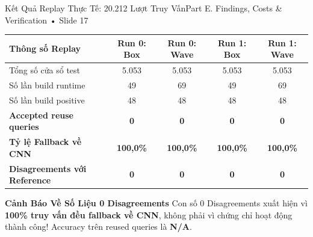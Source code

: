 \documentclass[aspectratio=169, 10pt]{beamer}
\begin{document}
\begin{frame}{Kết Quả Replay Thực Tế: 20.212 Lượt Truy Vấn}{Part E. Findings, Costs \& Verification • Slide 17}
    \small
    \begin{tabular}{lcccc}
        \toprule
        \textbf{Thông số Replay} & \textbf{Run 0: Box} & \textbf{Run 0: Wave} & \textbf{Run 1: Box} & \textbf{Run 1: Wave} \\
        \midrule
        Tổng số cửa sổ test & 5.053 & 5.053 & 5.053 & 5.053 \\
        Số lần build runtime & 49 & 69 & 49 & 69 \\
        Số lần build positive & 48 & 48 & 48 & 48 \\
        \textbf{Accepted reuse queries} & \textcolor{AlertRed}{\textbf{0}} & \textcolor{AlertRed}{\textbf{0}} & \textcolor{AlertRed}{\textbf{0}} & \textcolor{AlertRed}{\textbf{0}} \\
        \textbf{Tỷ lệ Fallback về CNN} & \textcolor{AlertRed}{\textbf{100,0\%}} & \textcolor{AlertRed}{\textbf{100,0\%}} & \textcolor{AlertRed}{\textbf{100,0\%}} & \textcolor{AlertRed}{\textbf{100,0\%}} \\
        \textbf{Disagreements với Reference} & \textcolor{MintGreen}{\textbf{0}} & \textcolor{MintGreen}{\textbf{0}} & \textcolor{MintGreen}{\textbf{0}} & \textcolor{MintGreen}{\textbf{0}} \\
        \bottomrule
    \end{tabular}
    \vspace{0.3cm}
    \begin{alertblock}{\textbf{Cảnh Báo Về Số Liệu 0 Disagreements}}
        Con số 0 Disagreements xuất hiện vì \textbf{100\% truy vấn đều fallback về CNN}, không phải vì chứng chỉ hoạt động thành công! Accuracy trên reused queries là \textbf{N/A}.
    \end{alertblock}
\end{frame}
\end{document}
